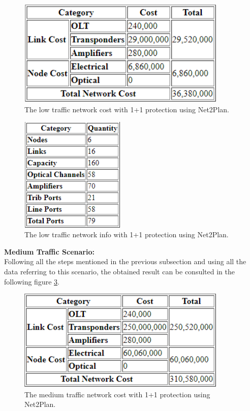 \begin{figure}[h!]
\centering
\includegraphics[width=10cm]{sdf/heuristic/figures/Low_Network_Cost_Protec_Opaque}
\caption{The low traffic network cost with 1+1 protection using Net2Plan.}
\label{Low_Network_Cost_Protec_Opaque}
\end{figure}

\begin{figure}[h!]
\centering
\includegraphics[width=5cm]{sdf/heuristic/figures/Low_Network_Info_Protec_Opaque}
\caption{The low traffic network info with 1+1 protection using Net2Plan.}
\label{Low_Network_Info_Protec_Opaque}
\end{figure}

\newpage
\textbf{Medium Traffic Scenario:}\\

Following all the steps mentioned in the previous subsection and using all the data referring to this scenario, the obtained result can be consulted in the following figure \ref{Medium_Network_Cost_Protec_Opaque}.

\begin{figure}[h!]
\centering
\includegraphics[width=10cm]{sdf/heuristic/figures/Medium_Network_Cost_Protec_Opaque}
\caption{The medium traffic network cost with 1+1 protection using Net2Plan.}
\label{Medium_Network_Cost_Protec_Opaque}
\end{figure}

